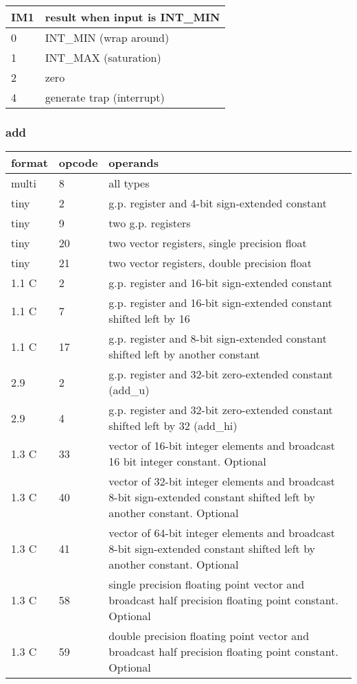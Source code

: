 \documentclass[forwardcom.tex]{subfiles}
\begin{document}
\begin{longtable}{|p{12mm}|p{80mm}|}
\endfirsthead
\endhead
\hline
\bfseries IM1 & \bfseries result when input is INT\_MIN \\ \hline
0  & INT\_MIN (wrap around) \\ \hline
1  & INT\_MAX (saturation)  \\ \hline
2  & zero                   \\ \hline
4  & generate trap (interrupt) \\ \hline
\end{longtable}
\vspace{2mm}


\subsubsection{add}
\label{table:addInstruction}
\begin{tabular}{|p{12mm}|p{12mm}|p{110mm}|}
\hline
\bfseries format & \bfseries opcode & \bfseries operands \\ \hline
multi &  8 & all types \\ \hline
tiny  &  2 & g.p. register and 4-bit sign-extended constant \\ \hline
tiny  &  9 & two g.p. registers \\ \hline
tiny  & 20 & two vector registers, single precision float \\ \hline
tiny  & 21 & two vector registers, double precision float \\ \hline
1.1 C &  2 & g.p. register and 16-bit sign-extended constant \\ \hline
1.1 C &  7 & g.p. register and 16-bit sign-extended constant shifted left by 16 \\ \hline
1.1 C & 17 & g.p. register and 8-bit sign-extended constant shifted left by another constant \\ \hline
2.9   &  2 & g.p. register and 32-bit zero-extended constant (add\_u) \\ \hline
2.9   &  4 & g.p. register and 32-bit zero-extended constant shifted left by 32 (add\_hi) \\ \hline
1.3 C & 33 & vector of 16-bit integer elements and broadcast 16 bit integer constant. Optional \\ \hline
1.3 C & 40 & vector of 32-bit integer elements and broadcast 8-bit sign-extended constant shifted left by another constant. Optional \\ \hline
1.3 C & 41 & vector of 64-bit integer elements and broadcast 8-bit sign-extended constant shifted left by another constant. Optional \\ \hline
1.3 C & 58 & single precision floating point vector and broadcast half precision floating point constant. Optional \\ \hline
1.3 C & 59 & double precision floating point vector and broadcast half precision floating point constant. Optional \\ \hline
\end{tabular}
\vspace{2mm}
\end{document}
